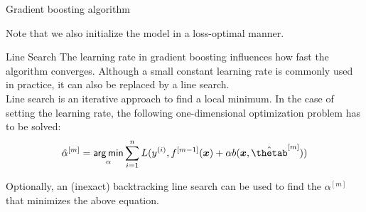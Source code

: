 \begin{vbframe}{Gradient boosting algorithm}



Note that we also initialize the model in a loss-optimal manner. %

\end{vbframe}

\begin{vbframe}{Line Search}
The learning rate in gradient boosting influences how fast the algorithm converges. 
Although a small constant learning rate is commonly used in practice, it can also be replaced by a line search.\\\lz
Line search is an iterative approach to find a local minimum. In the case of setting the learning rate, the following one-dimensional optimization problem has to be solved:
$$\hat{\alpha}^{[m]} = \argmin_{\alpha} \sumin L(\yi, \fmd(\xv) + \alpha b(\xv, \thetamh))$$

Optionally, an (inexact) backtracking line search can be used to find the 
$\alpha^{[m]}$ that minimizes the above equation.

\end{vbframe}

\endlecture



